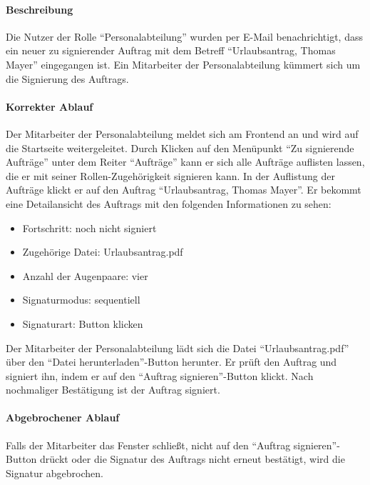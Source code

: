\paragraph{Beschreibung}
Die Nutzer der Rolle \enquote{Personalabteilung} wurden per E-Mail benachrichtigt, dass ein neuer zu signierender Auftrag mit dem Betreff \enquote{Urlaubsantrag, Thomas Mayer} eingegangen ist. Ein Mitarbeiter der Personalabteilung kümmert sich um die Signierung des Auftrags.
\paragraph{Korrekter Ablauf}
Der Mitarbeiter der Personalabteilung meldet sich am Frontend an und wird auf die Startseite weitergeleitet. Durch Klicken auf den Menüpunkt \enquote{Zu signierende Aufträge} unter dem Reiter \enquote{Aufträge} kann er sich alle Aufträge auflisten lassen, die er mit seiner Rollen-Zugehörigkeit signieren kann. In der Auflistung der Aufträge klickt er auf den Auftrag \enquote{Urlaubsantrag, Thomas Mayer}. Er bekommt eine Detailansicht des Auftrags mit den folgenden Informationen zu sehen:
\begin{itemize}
	\item Fortschritt: noch nicht signiert
	\item Zugehörige Datei: Urlaubsantrag.pdf
	\item Anzahl der Augenpaare: vier
	\item Signaturmodus: sequentiell
	\item Signaturart: Button klicken
\end{itemize}
Der Mitarbeiter der Personalabteilung lädt sich die Datei \enquote{Urlaubsantrag.pdf} über den \enquote{Datei herunterladen}-Button herunter. Er prüft den Auftrag und signiert ihn, indem er auf den \enquote{Auftrag signieren}-Button klickt. Nach nochmaliger Bestätigung ist der Auftrag signiert.

\paragraph{Abgebrochener Ablauf}
Falls der Mitarbeiter das Fenster schließt, nicht auf den \enquote{Auftrag signieren}-Button drückt oder die Signatur des Auftrags nicht erneut bestätigt, wird die Signatur abgebrochen.
